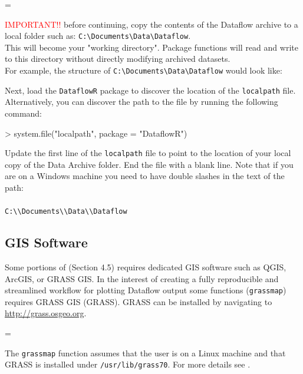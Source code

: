 \documentclass[12pt]{article}
\newenvironment{warning}
{\par\begin{mdframed}[linewidth=2pt,linecolor=red]
\begin{list}{}{\leftmargin=1cm
  \labelwidth=\leftmargin}\item[\Large\ding{43}]}
{\end{list}\end{mdframed}\par}
\begin{document}
\vspace{15pt}
\begin{warning}
\textcolor{red}{IMPORTANT!!} before continuing, copy the contents of the Dataflow archive to a local folder such as: \verb|C:\Documents\Data\Dataflow|.\\ This will become your "working directory". Package functions will read and write to this directory without directly modifying archived datasets.\\ 
For example, the structure of \verb|C:\Documents\Data\Dataflow| would look like:
\\

Next, load the \texttt{DataflowR} package to discover the location of the \texttt{localpath} file. Alternatively, you can discover the path to the file by running the following command:

\begin{Schunk}
\begin{Sinput}
> system.file("localpath", package = "DataflowR")
\end{Sinput}
\end{Schunk}


Update the first line of the \texttt{localpath} file to point to the location of your local copy of the Data Archive folder. End the file with a blank line. Note that if you are on a Windows machine you need to have double slashes in the text of the path: \\  
\\
\verb|C:\\Documents\\Data\\Dataflow|

\end{warning}

\subsection{GIS Software}
Some portions of  (Section 4.5) requires dedicated GIS software such as QGIS, ArcGIS, or GRASS GIS. In the interest of creating a fully reproducible and streamlined workflow for plotting Dataflow output some functions (\texttt{grassmap}) requires GRASS GIS (GRASS). GRASS can be installed by navigating to \href{http://grass.osgeo.org}{http://grass.osgeo.org}.

\vspace{15pt}
\begin{warning}
The \texttt{grassmap} function assumes that the user is on a Linux machine and that GRASS is installed under \texttt{/usr/lib/grass70}. For more details see \citet{rgrass7}.
\end{warning}
\end{document}
